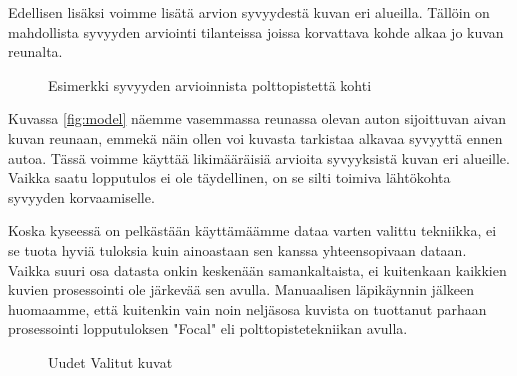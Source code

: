 Edellisen lisäksi voimme lisätä arvion syvyydestä kuvan eri alueilla. 
Tällöin on mahdollista syvyyden arviointi tilanteissa joissa korvattava kohde alkaa jo kuvan reunalta.

\begin{figure}[h]
\centering
{}
\caption{Esimerkki syvyyden arvioinnista polttopistettä kohti}
\label{fig:polttopiste_2}
\end{figure}

Kuvassa \ref{fig:model} näemme vasemmassa reunassa olevan auton sijoittuvan aivan kuvan reunaan, 
emmekä näin ollen voi kuvasta tarkistaa alkavaa syvyyttä ennen autoa.
Tässä voimme käyttää likimääräisiä arvioita syvyyksistä kuvan eri alueille. Vaikka saatu lopputulos ei ole täydellinen,
on se silti toimiva lähtökohta syvyyden korvaamiselle.

Koska kyseessä on pelkästään käyttämäämme dataa varten valittu tekniikka, ei se tuota hyviä tuloksia kuin ainoastaan sen kanssa yhteensopivaan dataan.
Vaikka suuri osa datasta onkin keskenään samankaltaista, ei kuitenkaan kaikkien kuvien prosessointi ole järkevää sen avulla.
Manuaalisen läpikäynnin jälkeen huomaamme, että kuitenkin vain noin neljäsosa kuvista on tuottanut parhaan prosessointi lopputuloksen "Focal" eli polttopistetekniikan avulla. 

\begin{figure}[h]
\centering
{}
\caption{Uudet Valitut kuvat}
\label{fig:selected2}
\end{figure}


